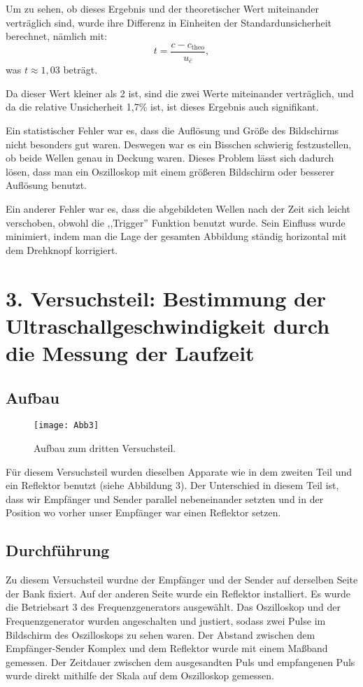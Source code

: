 \documentclass[11pt,a4paper]{article}
\begin{document}
Um zu sehen, ob dieses Ergebnis und der theoretischer Wert miteinander verträglich sind, wurde ihre Differenz in Einheiten der Standardunsicherheit berechnet, nämlich mit:
$$ t = \frac{c - c_\textrm{theo}}{u_{\bar{c}}}, $$
 was $t \approx 1,03 $ beträgt. 
	
Da dieser Wert kleiner als 2 ist, sind die zwei Werte miteinander verträglich, und da die relative Unsicherheit 1,7\% ist, ist dieses Ergebnis auch signifikant. 

Ein statistischer Fehler war es, dass die Auflösung und Größe des Bildschirms nicht besonders gut waren. Deswegen war es ein Bisschen schwierig festzustellen, ob beide Wellen genau in Deckung waren. Dieses Problem lässt sich dadurch lösen, dass man ein Oszilloskop mit einem größeren Bildschirm oder besserer Auflösung benutzt. 

Ein anderer Fehler war es, dass die abgebildeten Wellen nach der Zeit sich leicht verschoben, obwohl die ,,Trigger'' Funktion benutzt wurde. Sein Einfluss wurde minimiert, indem man die Lage der gesamten Abbildung ständig horizontal mit dem Drehknopf korrigiert. 





\section{3. Versuchsteil: Bestimmung der Ultraschallgeschwindigkeit durch die Messung der Laufzeit}

\subsection{Aufbau}
\begin{figure}[h]
	\centering
	\texttt{[image: Abb3]}
	\caption{Aufbau zum dritten Versuchsteil. \cite{Anleitung}}
\end{figure}
Für diesem Versuchsteil wurden dieselben Apparate wie in dem zweiten Teil und ein Reflektor benutzt (siehe Abbildung 3). Der Unterschied in diesem Teil ist, dass wir Empf\"anger und Sender parallel nebeneinander setzten und in der Position wo vorher unser Empf\"anger war einen Reflektor setzen.

\subsection{Durchführung}
Zu diesem Versuchsteil wurdne der Empfänger und der Sender auf derselben Seite der Bank fixiert. Auf der anderen Seite wurde ein Reflektor installiert. Es wurde die Betriebsart 3 des Frequenzgenerators ausgewählt. Das Oszilloskop und der Frequenzgenerator wurden angeschalten und justiert, sodass zwei Pulse im Bildschirm des Oszilloskops zu sehen waren. Der Abstand zwischen dem Empfänger-Sender Komplex und dem Reflektor wurde mit einem Maßband gemessen. Der Zeitdauer zwischen dem ausgesandten Puls und empfangenen Puls wurde direkt mithilfe der Skala auf dem Oszilloskop gemessen. 
\end{document}
